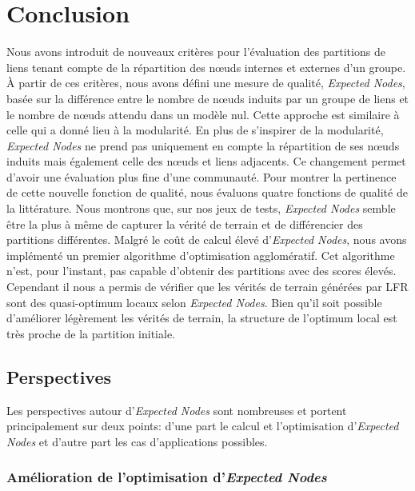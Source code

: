 \section{Conclusion}

Nous avons introduit de nouveaux critères pour l'évaluation des partitions de liens tenant compte de la répartition des n\oe{}uds internes et externes d'un groupe.
\`A partir de ces critères, nous avons défini une mesure de qualité, \emph{Expected Nodes}, basée sur la différence entre le nombre de n\oe{}uds induits par un groupe de liens et le nombre de n\oe{}uds attendu dans un modèle nul.
Cette approche est similaire à celle qui a donné lieu à la modularité.
En plus de s'inspirer de la modularité, \emph{Expected Nodes} ne prend pas uniquement en compte la répartition de ses n\oe{}uds induits mais également celle des n\oe{}uds et liens adjacents.
Ce changement permet d'avoir une évaluation plus fine d'une communauté.
Pour montrer la pertinence de cette nouvelle fonction de qualité, nous évaluons quatre fonctions de qualité de la littérature.
Nous montrons que, sur nos jeux de tests, \emph{Expected Nodes} semble être la plus à même de capturer la vérité de terrain et de différencier des partitions différentes.
Malgré le coût de calcul élevé d'\emph{Expected Nodes}, nous avons implémenté un premier algorithme d'optimisation agglomératif.
Cet algorithme n'est, pour l'instant, pas capable d'obtenir des partitions avec des scores élevés.
Cependant il nous a permis de vérifier que les vérités de terrain générées par LFR sont des quasi-optimum locaux selon \emph{Expected Nodes}.
Bien qu'il soit possible d'améliorer légèrement les vérités de terrain, la structure de l'optimum local est très proche de la partition initiale.


\subsection{Perspectives}

Les perspectives autour d'\emph{Expected Nodes} sont nombreuses et portent principalement sur deux points: d'une part le calcul et l'optimisation d'\emph{Expected Nodes} et d'autre part les cas d'applications possibles.

\subsubsection{Amélioration de l'optimisation d'\emph{Expected Nodes}}

